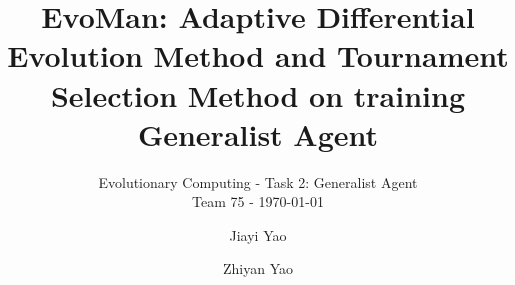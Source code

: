 \documentclass[sigconf]{acmart}
\begin{document}
\title{EvoMan: Adaptive Differential Evolution Method and Tournament Selection Method on training Generalist Agent}
\subtitle{Evolutionary Computing - Task 2: Generalist Agent\\Team 75 - \today}

\author{Jiayi Yao}


\author{Zhiyan Yao}


\maketitle
\clearpage


%
\end{document}
